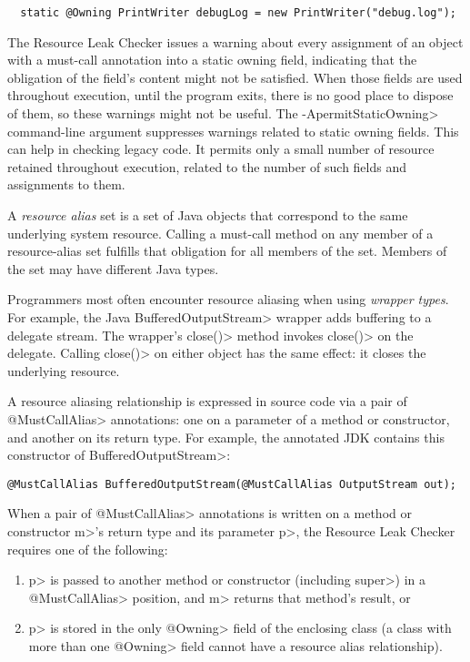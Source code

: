 \begin{smaller}
\begin{Verbatim}
  static @Owning PrintWriter debugLog = new PrintWriter("debug.log");
\end{Verbatim}
\end{smaller}

\noindent
The Resource Leak Checker issues a warning about every assignment of an
object with a must-call annotation into a static owning field,
indicating that the obligation of the field's content might not be
satisfied.  When those fields are used throughout execution, until the
program exits, there is no good place to dispose of them, so these warnings
might not be useful.  The \<-ApermitStaticOwning> command-line argument
suppresses warnings related to static owning fields.  This can help in
checking legacy code.  It permits only a small number of resource retained
throughout execution, related to the number of such fields and assignments
to them.



A \emph{resource alias} set is a set of Java objects that
correspond to the same underlying system resource.
Calling a must-call method on any member of a resource-alias set
fulfills that obligation for all members of the set.
Members of the set may have different Java types.

Programmers most often encounter resource aliasing when using \emph{wrapper types}.
For example, the Java \<Buffered\-Output\-Stream> wrapper adds buffering to a
delegate stream.
The wrapper's \<close()> method invokes \<close()> on the delegate.  Calling
\<close()> on either object has the same effect:  it closes the underlying resource.

A resource aliasing relationship is expressed in source code via a pair of \<@MustCallAlias> annotations:
one on a parameter of a method or constructor, and another on its return type.
For example, the annotated JDK contains this constructor of \<BufferedOutputStream>:
\begin{Verbatim}
@MustCallAlias BufferedOutputStream(@MustCallAlias OutputStream out);
\end{Verbatim}

When a pair of \<@MustCallAlias> annotations is written on a method or constructor \<m>'s return type
and its parameter \<p>, the Resource Leak Checker requires one of the following:
\begin{enumerate}
\item \<p> is passed to another method or constructor (including \<super>) in a
  \<@MustCallAlias> position, and \<m> returns that method's result, or
\item \<p> is stored in the only \<@Owning> field of the enclosing class (a class with more than one
  \<@Owning> field cannot have a resource alias relationship).
\end{enumerate}

